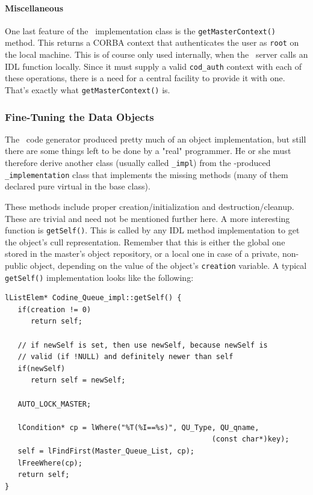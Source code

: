 \paragraph{Miscellaneous}
One last feature of the \master\ implementation class is the
\texttt{getMasterContext()} method. This returns a CORBA context that
authenticates the user as \texttt{root} on the local machine. This is of
course only used internally, when the \qidl\ server calls an IDL function
locally. Since it must supply a valid \texttt{cod\_auth} context with each of
these operations, there is a need for a central facility to provide it with
one. That's exactly what \texttt{getMasterContext()} is.

\subsubsection{\label{s_prog_server_objects}Fine-Tuning the Data Objects}
The \idlgen\ code generator produced pretty much of an object implementation,
but still there are some things left to be done by a "real" programmer. He or
she must therefore derive another class (usually called \texttt{\_impl}) from
the \idlgen-produced \texttt{\_implementation} class that implements the
missing methods (many of them declared pure virtual in the base class).

These methods include proper creation/initialization and destruction/clean\-up.
These are trivial and need not be mentioned further here. A more interesting
function is \texttt{getSelf()}. This is called by any IDL method
implementation to get the object's cull representation. Remember that this is
either the global one stored in the master's object repository, or a local
one in case of a private, non-public object, depending on the value of the
object's \texttt{creation} variable. A typical \texttt{getSelf()}
implementation looks like the following:

\begin{Verbatim}[fontsize=\small, frame=single]
lListElem* Codine_Queue_impl::getSelf() {
   if(creation != 0)
      return self;

   // if newSelf is set, then use newSelf, because newSelf is
   // valid (if !NULL) and definitely newer than self
   if(newSelf)
      return self = newSelf;

   AUTO_LOCK_MASTER;

   lCondition* cp = lWhere("%T(%I==%s)", QU_Type, QU_qname,
                                                (const char*)key);
   self = lFindFirst(Master_Queue_List, cp);
   lFreeWhere(cp);
   return self;
}
\end{Verbatim}

